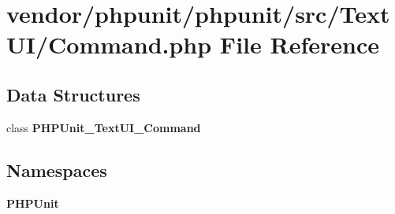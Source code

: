 \section{vendor/phpunit/phpunit/src/\+Text\+U\+I/\+Command.php File Reference}
\label{vendor_2phpunit_2phpunit_2src_2_text_u_i_2_command_8php}
\subsection*{Data Structures}
\begin{DoxyCompactItemize}
\item 
class {\bf P\+H\+P\+Unit\+\_\+\+Text\+U\+I\+\_\+\+Command}
\end{DoxyCompactItemize}
\subsection*{Namespaces}
\begin{DoxyCompactItemize}
\item 
 {\bf P\+H\+P\+Unit}
\end{DoxyCompactItemize}
